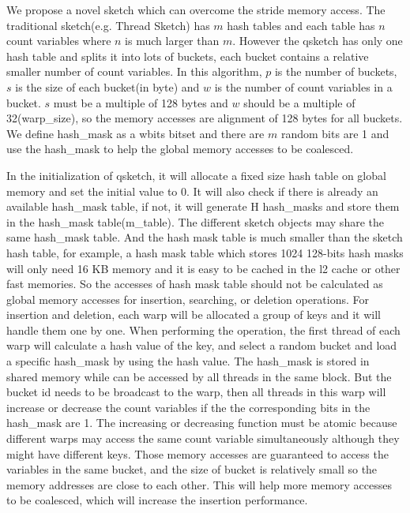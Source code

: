 \documentclass[conference]{IEEEtran}
\begin{document}
We propose a novel sketch which can overcome the stride memory access. The traditional sketch(e.g. Thread Sketch) has $m$ hash tables and each table has $n$ count variables where $n$ is much larger than $m$. However the qsketch has only one hash table and splits it into lots of buckets, each bucket contains a relative smaller number of count variables. In this algorithm, $p$ is the number of buckets, $s$ is the size of each bucket(in byte) and $w$ is the number of count variables in a bucket. $s$ must be a multiple of 128 bytes and $w$ should be a multiple of 32(warp\_size), so the memory accesses are alignment of 128 bytes for all buckets. We define hash\_mask as a w\-bits bitset and there are $m$ random bits are 1 and use the hash\_mask to help the global memory accesses to be coalesced.

In the initialization of qsketch, it will allocate a fixed size hash table on global memory and set the initial value to 0. It will also check if there is already an available hash\_mask table, if not, it will generate H hash\_masks and store them in the hash\_mask table(m\_table). The different sketch objects may share the same hash\_mask table. And the hash mask table is much smaller than the sketch hash table, for example, a hash mask table which stores 1024 128-bits hash masks will only need 16 KB memory and it is easy to be cached in the l2 cache or other fast memories. So the accesses of hash mask table should not be calculated as global memory accesses for insertion, searching, or deletion operations.
For insertion and deletion, each warp will be allocated a group of keys and it will handle them one by one. When performing the operation, the first thread of each warp will calculate a hash value of the key, and select a random bucket and load a specific hash\_mask by using the hash value. The hash\_mask is stored in shared memory while can be accessed by all threads in the same block. But the bucket id needs to be broadcast to the warp, then all threads in this warp will increase or decrease the count variables if the the corresponding bits in the hash\_mask are 1. The increasing or decreasing function must be atomic because different warps may access the same count variable simultaneously although they might have different keys. Those memory accesses are guaranteed to access the variables in the same bucket, and the size of bucket is relatively small so the memory addresses are close to each other. This will help more memory accesses to be coalesced, which will increase the insertion performance. 
\end{document}
